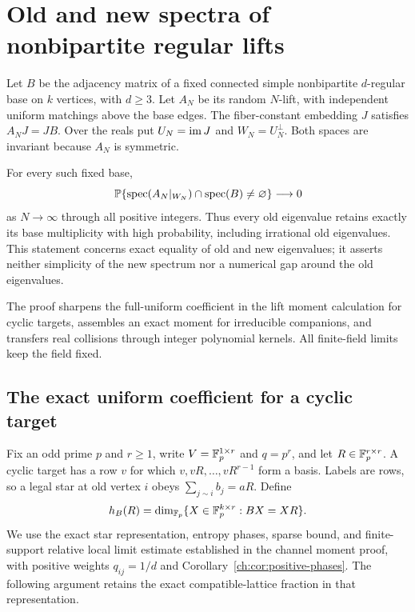 \section{Old and new spectra of nonbipartite regular lifts}
\label{sec:lift-spectral}
Let $B$ be the adjacency matrix of a fixed connected simple
nonbipartite $d$-regular base on $k$ vertices, with $d\ge3$.
Let $A_N$ be its random $N$-lift, with independent uniform matchings
above the base edges. The fiber-constant embedding $J$ satisfies
$A_NJ=JB$. Over the reals put $U_N=\operatorname{im} J$ and $W_N=U_N^\perp$.
Both spaces are invariant because $A_N$ is symmetric.

\begin{theorem}\label{lift:thm:old-new}
For every such fixed base,
\[
 \mathbb P\{\operatorname{spec}(A_N|_{W_N})\cap\operatorname{spec}(B)\ne\varnothing\}
 \longrightarrow0
\]
as $N\to\infty$ through all positive integers. Thus every old
eigenvalue retains exactly its base multiplicity with high probability,
including irrational old eigenvalues. This statement concerns exact
equality of old and new eigenvalues; it asserts neither simplicity of
the new spectrum nor a numerical gap around the old eigenvalues.
\end{theorem}

The proof sharpens the full-uniform coefficient in the lift moment
calculation for cyclic targets, assembles an exact moment for
irreducible companions, and transfers real collisions through integer
polynomial kernels. All finite-field limits keep the field fixed.

\subsection{The exact uniform coefficient for a cyclic target}
Fix an odd prime $p$ and $r\ge1$, write $V=\mathbb F_p^{1\times r}$ and $q=p^r$,
and let $R\in\mathbb F_p^{r\times r}$. A cyclic target has a row $v$ for which
$v,vR,\ldots,vR^{r-1}$ form a basis. Labels are rows, so a legal star at old
vertex $i$ obeys $\sum_{j\sim i}b_j=aR$. Define
\[
 h_B(R)=\dim_{\mathbb F_p}\{X\in\mathbb F_p^{k\times r}:BX=XR\}.
\]
We use the exact star representation, entropy phases, sparse bound,
and finite-support relative local limit estimate established in the
channel moment proof, with positive weights $q_{ij}=1/d$ and
Corollary~\ref{ch:cor:positive-phases}. The following argument
retains the exact compatible-lattice fraction in that representation.

